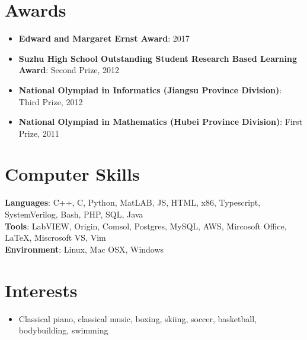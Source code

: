 \documentclass[hidelinks,letterpaper,11pt]{article} %
\newcommand{\resumeItem}[2]{
  \item\small{
    \textbf{#1}{: #2 \vspace{-2pt}}
  }
}
\newcommand{\resumeSubItem}[2]{\resumeItem{#1}{#2}\vspace{-4pt}}
\newcommand{\resumeSubHeadingListStart}{\begin{itemize}[leftmargin=*]}
\newcommand{\resumeSubHeadingListEnd}{\end{itemize}}
\begin{document}
\section{Awards}
  \resumeSubHeadingListStart
    \resumeSubItem{Edward and Margaret Ernst Award} {2017}
    \resumeSubItem{Suzhu High School Outstanding Student Research Based Learning Award} {Second Prize, 2012}
    \resumeSubItem{National Olympiad in Informatics (Jiangsu Province Division)} {Third Prize, 2012}
    \resumeSubItem{National Olympiad in Mathematics (Hubei Province Division)} {First Prize, 2011}
  \resumeSubHeadingListEnd

\section{Computer Skills}
\textbf{Languages}: C++, C, Python, MatLAB, JS, HTML, x86, Typescript, SystemVerilog, Bash, PHP, SQL, Java \\
\textbf{Tools}: LabVIEW, Origin, Comsol, Postgres, MySQL, AWS, Mircosoft Office, LaTeX, Miscrosoft VS, Vim \\
\textbf{Environment}: Linux, Mac OSX, Windows \\

\section{Interests}
  \resumeSubHeadingListStart
      \item\small{
        {Classical piano, classical music, boxing, skiing, soccer, basketball, bodybuilding, swimming \vspace{-2pt}}
      }
  \resumeSubHeadingListEnd

%


\end{document}

